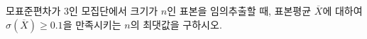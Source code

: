 모표준편차가 3인 모집단에서 크기가 $n$인 표본을 임의추출할 때, 표본평균 $\overline{X}$에 대하여 $\sigma(\overline{X})\ge 0.1$을 만족시키는 $n$의 최댓값을 구하시오.
